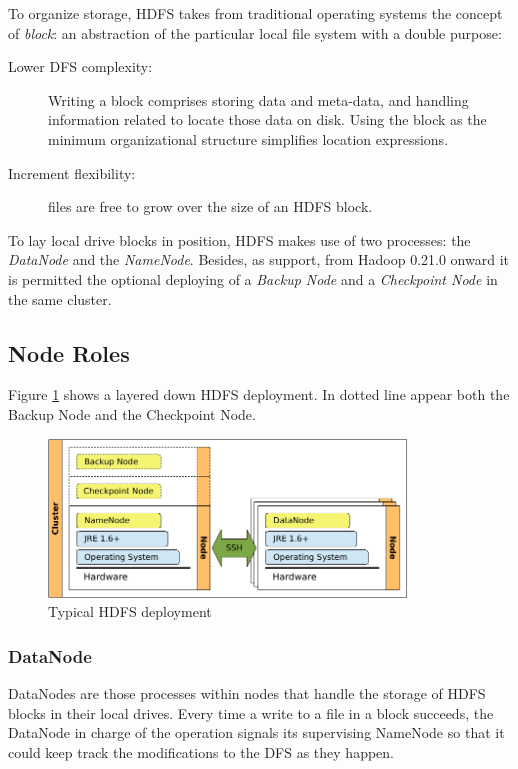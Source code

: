 To organize storage, HDFS takes from traditional operating systems the concept of \emph{block}: an abstraction of the particular local file system with a double purpose:

\begin{description}
 \item[Lower DFS complexity:] Writing a block comprises storing data and meta-data, and handling information related to locate those data on disk. Using the block as the minimum organizational structure simplifies location expressions.
 \item[Increment flexibility:] files are free to grow over the size of an HDFS block.
\end{description}

To lay local drive blocks in position, HDFS makes use of two processes: the \emph{DataNode} and the \emph{NameNode}. Besides, as support, from Hadoop 0.21.0 onward it is permitted the optional deploying of a \emph{Backup Node} and a \emph{Checkpoint Node} in the same cluster.

\subsection{Node Roles}\label{subsec:rolesnodos}
\noindent Figure \ref{fig:desplieguehdfs} shows a layered down HDFS deployment. In dotted line appear both the Backup Node and the Checkpoint Node.

\begin{figure}[tbp]
\begin{center}
\includegraphics[width=0.85\textwidth]{imagenes/017.pdf}
 \caption{Typical HDFS deployment}
\label{fig:desplieguehdfs}
\end{center}
\end{figure}

\subsubsection{DataNode}\label{subsubsec:datanode}
\noindent DataNodes are those processes within nodes that handle the storage of HDFS blocks in their local drives. Every time a write to a file in a block succeeds, the DataNode in charge of the operation signals its supervising NameNode so that it could keep track the modifications to the DFS as they happen.

